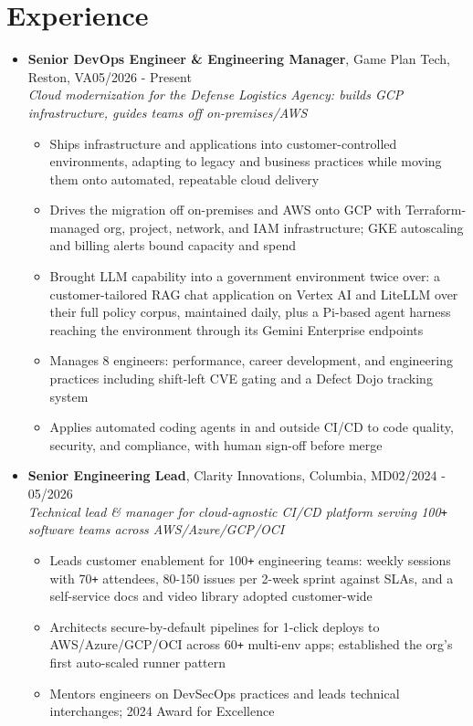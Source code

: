 \documentclass[10pt]{extarticle}
\begin{document}

\section{Experience}
\begin{itemize}
    \itemsep0.1em
    \item \textbf{Senior DevOps Engineer \& Engineering Manager}, Game Plan Tech, Reston, VA\hfill 05/2026 - Present \\ \emph{Cloud modernization for the Defense Logistics Agency: builds GCP infrastructure, guides teams off on-premises/AWS}
    \begin{itemize}
        \itemsep0em
        \item Ships infrastructure and applications into customer-controlled environments, adapting to legacy and business practices while moving them onto automated, repeatable cloud delivery
        \item Drives the migration off on-premises and AWS onto GCP with Terraform-managed org, project, network, and IAM infrastructure; GKE autoscaling and billing alerts bound capacity and spend
        \item Brought LLM capability into a government environment twice over: a customer-tailored RAG chat application on Vertex AI and LiteLLM over their full policy corpus, maintained daily, plus a Pi-based agent harness reaching the environment through its Gemini Enterprise endpoints
        \item Manages 8 engineers: performance, career development, and engineering practices including shift-left CVE gating and a Defect Dojo tracking system
        \item Applies automated coding agents in and outside CI/CD to code quality, security, and compliance, with human sign-off before merge
    \end{itemize}

    \item \textbf{Senior Engineering Lead}, Clarity Innovations, Columbia, MD\hfill 02/2024 - 05/2026 \\ \emph{ Technical lead \& manager for cloud-agnostic CI/CD platform serving 100\texttt{+} software teams across AWS/Azure/GCP/OCI}
    \begin{itemize}
        \itemsep0em
        \item Leads customer enablement for 100\verb!+! engineering teams: weekly sessions with 70\verb!+! attendees, 80-150 issues per 2-week sprint against SLAs, and a self-service docs and video library adopted customer-wide
        \item Architects secure-by-default pipelines for 1-click deploys to AWS/Azure/GCP/OCI across 60\verb!+! multi-env apps; established the org's first auto-scaled runner pattern
        \item Mentors engineers on DevSecOps practices and leads technical interchanges; 2024 Award for Excellence
    \end{itemize}


\end{itemize}
\end{document}
